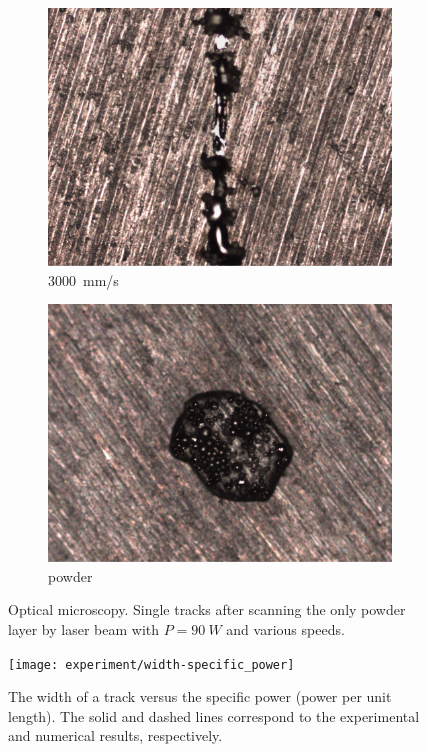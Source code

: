 \documentclass{article}
\begin{document}
\begin{figure}
\begin{subfigure}[b]{0.24\textwidth}
        \includegraphics[width=\textwidth]{experiment/photos/90W_V3000}
        \caption{\SI{3000}{mm/s}}
    \end{subfigure}\:
    \begin{subfigure}[b]{0.24\textwidth}
        \includegraphics[width=\textwidth]{experiment/photos/powder}
        \caption{powder}
    \end{subfigure}
    \caption{
        Optical microscopy.
        Single tracks after scanning the only powder layer by laser beam
        with \(P=\SI{90}{W}\) and various speeds.
    }
    \label{fig:3d:experiment}
\end{figure}

\begin{figure}
    \centering
    \texttt{[image: experiment/width-specific\_power]}
    \caption{
        The width of a track versus the specific power (power per unit length).
        The solid and dashed lines correspond to the experimental and numerical results, respectively.
    }\label{fig:3d:width}
\end{figure}
\end{document}
